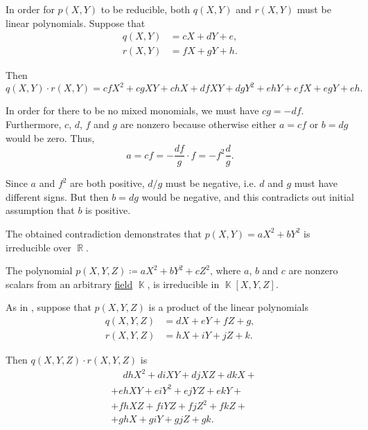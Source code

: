 \begin{example}
\begin{thmenum}
    In order for \( p(X, Y) \) to be reducible, both \( q(X, Y) \) and \( r(X, Y) \) must be linear polynomials. Suppose that
    \begin{align*}
      q(X, Y) &= c X + d Y + e, \\
      r(X, Y) &= f X + g Y + h.
    \end{align*}

    Then
    \begin{equation*}
      q(X, Y) \cdot r(X, Y) = c f X^2 + c g X Y + c h X + d f X Y + d g Y^2 + e h Y + e f X + e g Y + e h.
    \end{equation*}

    In order for there to be no mixed monomials, we must have \( c g = - d f \). Furthermore, \( c \), \( d \), \( f \) and \( g \) are nonzero because otherwise either \( a = c f \) or \( b = d g \) would be zero. Thus,
    \begin{equation*}
      a = c f = - \frac {df} g \cdot f = -f^2 \frac d g.
    \end{equation*}

    Since \( a \) and \( f^2 \) are both positive, \( d / g \) must be negative, i.e. \( d \) and \( g \) must have different signs. But then \( b = d g \) would be negative, and this contradicts out initial assumption that \( b \) is positive.

    The obtained contradiction demonstrates that \( p(X, Y) = a X^2 + b Y^2 \) is irreducible over \( \BbbR \).

     The polynomial \( p(X, Y, Z) \coloneqq a X^2 + b Y^2 + c Z^2 \), where \( a \), \( b \) and \( c \) are nonzero scalars from an arbitrary \hyperref[def:field]{field} \( \BbbK \), is irreducible in \( \BbbK[X, Y, Z] \).

    As in , suppose that \( p(X, Y, Z) \) is a product of the linear polynomials
    \begin{align*}
      q(X, Y, Z) &= d X + e Y + f Z + g, \\
      r(X, Y, Z) &= h X + i Y + j Z + k.
    \end{align*}

    Then \( q(X, Y, Z) \cdot r(X, Y, Z) \) is
    \begin{align*}
      &\phantom{{}+{}}
      d h X^2 + d i X Y + d j X Z + d k X
      + \\ &+
      e h X Y + e i Y^2 + e j Y Z + e k Y
      + \\ &+
      f h X Z + f i Y Z + f j Z^2 + f k Z
      + \\ &+
      g h X + g i Y + g j Z + g k.
    \end{align*}


\end{thmenum}
\end{example}
